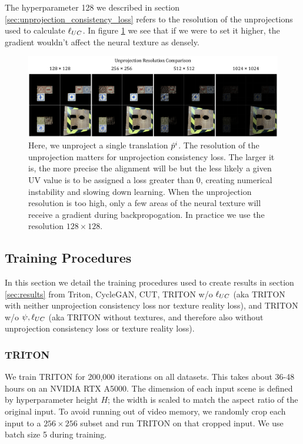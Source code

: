 	\bigskip
	
	The hyperparameter 128 we described in section \ref{sec:unprojection_consistency_loss} refers to the resolution of the unprojections used to calculate $\ell_{UC}$.
	In figure \ref{fig:unprojection_resolution_comparison} we see that if we were to set it higher, the gradient wouldn't affect the neural texture as densely.

	\begin{figure}[H]
		\begin{center}
			\includegraphics[width=400pt]{../images/unprojection_resolution_comparison.pdf}
		\end{center}
		\caption{
			Here, we unproject a single translation $\hat{p}^i$. The resolution of the unprojection matters for unprojection consistency loss. The larger it is, the more precise the alignment will be but the less likely a given UV value is to be assigned a loss greater than 0, creating numerical instability and slowing down learning. 
			When the unprojection resolution is too high, only a few areas of the neural texture will receive a gradient during backpropogation. In practice we use the resolution $128\times128$.
		}
		\label{fig:unprojection_resolution_comparison}
	\end{figure}

\subsection{Training Procedures}

	In this section we detail the training procedures used to create results in section \ref{sec:results} from Triton, CycleGAN, CUT,
		TRITON w/o $\ell_{UC}$ (aka TRITON with neither unprojection consistency loss nor texture reality loss), and
		TRITON w/o $\psi, \ell_{UC}$ (aka TRITON without textures, and therefore also without unprojection consistency loss or texture reality loss).

	\subsubsection{TRITON}
	\label{par:triton}
	We train TRITON for 200,000 iterations on all datasets. This takes about 36-48 hours on an NVIDIA RTX A5000. 
	The dimension of each input scene is defined by hyperparameter height $H$; the width is scaled to match the aspect ratio of the original input.
	To avoid running out of video memory, we randomly crop each input to a $256\times256$ subset and run TRITON on that cropped input.
	We use batch size 5 during training.
	
